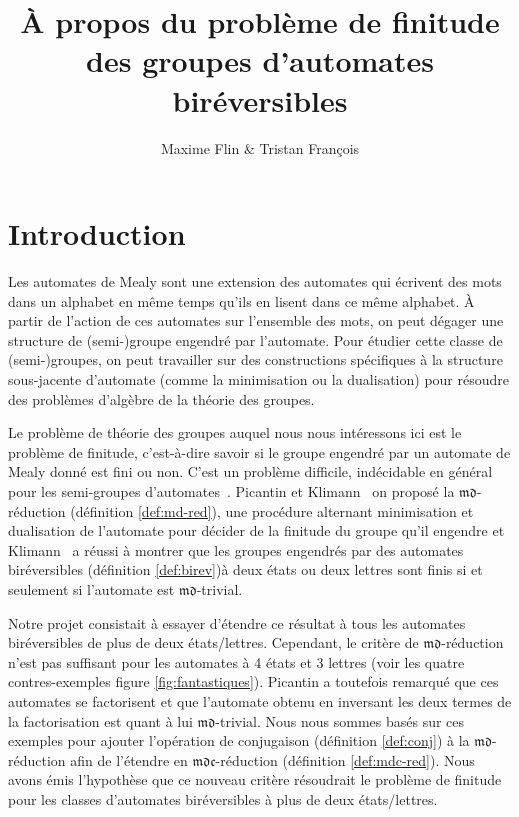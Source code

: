 \documentclass[11pt,a4paper]{article}
\title{À propos du problème de finitude des groupes d'automates biréversibles}
\author{Maxime Flin \& Tristan François}
\begin{document}
\maketitle

\section*{Introduction}
Les automates de Mealy sont une extension des automates qui écrivent des mots dans un alphabet en même temps qu'ils en lisent dans ce même alphabet. À partir de l'action de ces automates sur l'ensemble des mots, on peut dégager une structure de (semi-)groupe engendré par l'automate. Pour étudier cette classe de (semi-)groupes, on peut travailler sur des constructions spécifiques à la structure sous-jacente d'automate (comme la minimisation ou la dualisation) pour résoudre des problèmes d'algèbre de la théorie des groupes.

Le problème de théorie des groupes auquel nous nous intéressons ici est le problème de finitude, c’est-à-dire savoir si le groupe engendré par un automate de Mealy donné est fini ou non. C'est un problème difficile, indécidable en général pour les semi-groupes d'automates~\cite{Undecidable}. Picantin et Klimann~\cite{DBLP:journals/corr/abs-1105-4725} on proposé la $\mathfrak{md}$-réduction (définition \ref{def:md-red}), une procédure alternant minimisation et dualisation de l'automate pour décider de la finitude du groupe qu'il engendre et Klimann~\cite{Klimann13} a réussi à montrer que les groupes engendrés par des automates biréversibles (définition \ref{def:birev})à deux états ou deux lettres sont finis si et seulement si l'automate est $\mathfrak{md}$-trivial.

Notre projet consistait à essayer d'étendre ce résultat à tous les automates biréversibles de plus de deux états/lettres. Cependant,  le critère de $\mathfrak{md}$-réduction n'est pas suffisant pour les automates à 4 états et 3 lettres (voir les quatre contres-exemples figure \ref{fig:fantastiques}). Picantin a toutefois remarqué que ces automates se factorisent et que l'automate obtenu en inversant les deux termes de la factorisation est quant à lui $\mathfrak{md}$-trivial. Nous nous sommes basés sur ces exemples pour ajouter l'opération de conjugaison (définition \ref{def:conj}) à la $\mathfrak{md}$-réduction afin de l'étendre en $\mathfrak{mdc}$-réduction (définition \ref{def:mdc-red}). Nous avons émis l'hypothèse que ce nouveau critère résoudrait le problème de finitude pour les classes d'automates biréversibles à plus de deux états/lettres.
\end{document}
